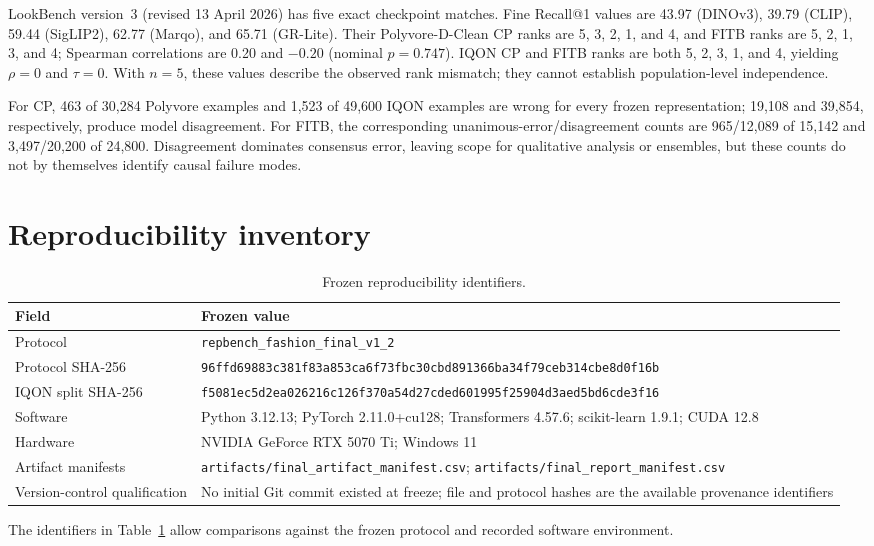 \documentclass[preprint,12pt]{elsarticle}
\begin{document}
LookBench version~3 (revised 13 April 2026) has five exact checkpoint matches. Fine Recall@1 values are 43.97 (DINOv3), 39.79 (CLIP), 59.44 (SigLIP2), 62.77 (Marqo), and 65.71 (GR-Lite). Their Polyvore-D-Clean CP ranks are 5, 3, 2, 1, and 4, and FITB ranks are 5, 2, 1, 3, and 4; Spearman correlations are 0.20 and $-0.20$ (nominal $p=0.747$). IQON CP and FITB ranks are both 5, 2, 3, 1, and 4, yielding $\rho=0$ and $\tau=0$. With $n=5$, these values describe the observed rank mismatch; they cannot establish population-level independence.

For CP, 463 of 30,284 Polyvore examples and 1,523 of 49,600 IQON examples are wrong for every frozen representation; 19,108 and 39,854, respectively, produce model disagreement. For FITB, the corresponding unanimous-error/disagreement counts are 965/12,089 of 15,142 and 3,497/20,200 of 24,800. Disagreement dominates consensus error, leaving scope for qualitative analysis or ensembles, but these counts do not by themselves identify causal failure modes.

\section{Reproducibility inventory}

\begin{table}[h!]
\caption{Frozen reproducibility identifiers.}
\label{stab:repro}
\centering\footnotesize
\begin{tabularx}{\columnwidth}{@{}>{\raggedright\arraybackslash}p{}>{\raggedright\arraybackslash}X@{}}
\toprule
Field & Frozen value \\
\midrule
Protocol & \texttt{repbench\_fashion\_final\_v1\_2} \\
Protocol SHA-256 & \texttt{96ffd69883c381f83a853ca6f73fbc30}\newline\texttt{cbd891366ba34f79ceb314cbe8d0f16b} \\
IQON split SHA-256 & \texttt{f5081ec5d2ea026216c126f370a54d27}\newline\texttt{cded601995f25904d3aed5bd6cde3f16} \\
Software & Python 3.12.13; PyTorch 2.11.0+cu128; Transformers 4.57.6; scikit-learn 1.9.1; CUDA 12.8 \\
Hardware & NVIDIA GeForce RTX 5070 Ti; Windows 11 \\
Artifact manifests & \texttt{artifacts/final\_artifact\_manifest.csv}; \texttt{artifacts/final\_report\_manifest.csv} \\
Version-control qualification & No initial Git commit existed at freeze; file and protocol hashes are the available provenance identifiers \\
\bottomrule
\end{tabularx}
\end{table}

The identifiers in Table~\ref{stab:repro} allow comparisons against the frozen protocol and recorded software environment.
\end{document}
